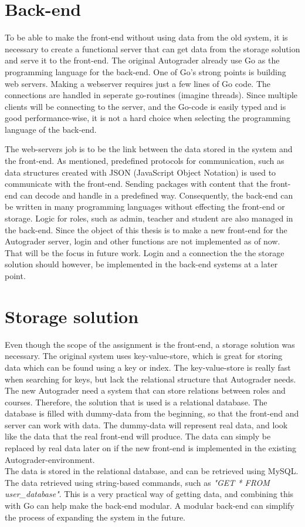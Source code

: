 


\section{Back-end}
To be able to make the front-end without using data from the old system, it is necessary to create a functional server that can get data from the storage solution and serve it to the front-end. The original Autograder already use Go as the programming language for the back-end. One of Go's strong points is building web servers. Making a webserver requires just a few lines of Go code. The connections are handled in seperate go-routines (imagine threads). Since multiple clients will be connecting to the server, and the Go-code is easily typed and is good performance-wise, it is not a hard choice when selecting the programming language of the back-end. 

The web-servers job is to be the link between the data stored in the system and the front-end. As mentioned, predefined protocols for communication, such as data structures created with JSON (JavaScript Object Notation) is used to communicate with the front-end. Sending packages with content that the front-end can decode and handle in a predefined way. Consequently, the back-end can be written in many programming languages without effecting the front-end or storage. Logic for roles, such as admin, teacher and student are also managed in the back-end. Since the object of this thesis is to make a new front-end for the Autograder server, login and other functions are not implemented as of now. That will be the focus in future work. Login and a connection the the storage solution should however, be implemented in the back-end systems at a later point. 

\section{Storage solution}
Even though the scope of the assignment is the front-end, a storage solution was necessary. The original system uses key-value-store, which is great for storing data which can be found using a key or index. The key-value-store is really fast when searching for keys, but lack the relational structure that Autograder needs. The new Autograder need a system that can store relations between roles and courses. Therefore, the solution that is used is a relational database. The database is filled with dummy-data from the beginning, so that the front-end and server can work with data. The dummy-data will represent real data, and look like the data that the real front-end will produce. The data can simply be replaced by real data later on if the new front-end is implemented in the existing Autograder-environment. \\The data is stored in the relational database, and can be retrieved using MySQL. The data retrieved using string-based commands, such as \emph{"GET * FROM user\_database"}. This is a very practical way of getting data, and combining this with Go can help make the back-end modular. A modular back-end can simplify the process of expanding the system in the future.